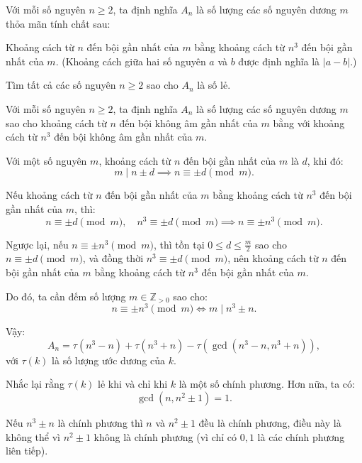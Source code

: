 \ifshowproblemandsoln
\ifshowproblem\begin{problem}[\gls{BW 2015}/P20]\label{problem:BW-2015-P20}\fi
\ifshowsoln\begin{problem}\fi
    Với mỗi số nguyên \( n \ge 2 \), ta định nghĩa \( A_n \) là số lượng các số nguyên dương \( m \) thỏa mãn tính chất sau:

    Khoảng cách từ \( n \) đến bội gần nhất của \( m \) bằng khoảng cách từ \( n^3 \) đến bội gần nhất của \( m \).  
    (Khoảng cách giữa hai số nguyên \( a \) và \( b \) được định nghĩa là \( |a - b| \).)

    Tìm tất cả các số nguyên \( n \ge 2 \) sao cho \( A_n \) là số lẻ.
\end{problem}
\fi

\ifshowsoln
\begin{soln}\footnotemark
    Với mỗi số nguyên \( n \ge 2 \), ta định nghĩa \( A_n \) là số lượng các số nguyên dương \( m \)
    sao cho khoảng cách từ \( n \) đến bội không âm gần nhất của \( m \) bằng với khoảng cách từ \( n^3 \) đến bội không âm gần nhất của \( m \).

    Với một số nguyên \( m \), khoảng cách từ \( n \) đến bội gần nhất của \( m \) là \( d \), khi đó:
    \[
        m \mid n \pm d \implies n \equiv \pm d \pmod{m}.
    \]

    Nếu khoảng cách từ \( n \) đến bội gần nhất của \( m \) bằng khoảng cách từ \( n^3 \) đến bội gần nhất của \( m \), thì:
    \[
        n \equiv \pm d \pmod{m},\quad n^3 \equiv \pm d \pmod{m} \implies n \equiv \pm n^3 \pmod{m}.
    \]

    Ngược lại, nếu \( n \equiv \pm n^3 \pmod{m} \), thì tồn tại \( 0 \le d \le \frac{m}{2} \) sao cho \( n \equiv \pm d \pmod{m} \),
    và đồng thời \( n^3 \equiv \pm d \pmod{m} \), nên khoảng cách từ \( n \) đến bội gần nhất của \( m \)
    bằng khoảng cách từ \( n^3 \) đến bội gần nhất của \( m \).

    Do đó, ta cần đếm số lượng \( m \in \mathbb{Z}_{>0} \) sao cho:
    \[
        n \equiv \pm n^3 \pmod{m} \iff m \mid n^3 \pm n.
    \]

    Vậy:
    \[
        A_n = \tau(n^3 - n) + \tau(n^3 + n) - \tau(\gcd(n^3 - n, n^3 + n)),
    \]
    với \( \tau(k) \) là số lượng ước dương của \( k \).

    Nhắc lại rằng \( \tau(k) \) lẻ khi và chỉ khi \( k \) là một số chính phương. Hơn nữa, ta có:
    \[
        \gcd(n, n^2 \pm 1) = 1.
    \]

    Nếu \( n^3 \pm n \) là chính phương thì \( n \) và \( n^2 \pm 1 \) đều là chính phương,
    điều này là không thể vì \( n^2 \pm 1 \) không là chính phương (vì chỉ có \( 0, 1 \) là các chính phương liên tiếp).


\end{soln}
\end{problem}
